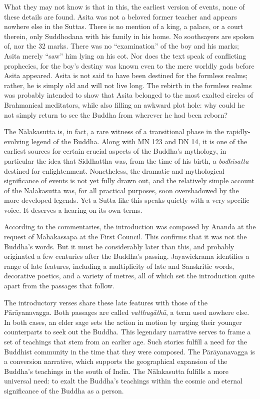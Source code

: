 \documentclass[12pt,openany]{book}%
\begin{document}
What they may not know is that in this, the earliest version of events, none of these details are found. Asita was not a beloved former teacher and appears nowhere else in the Suttas. There is no mention of a king, a palace, or a court therein, only Suddhodana with his family in his home. No soothsayers are spoken of, nor the 32 marks. There was no “examination” of the boy and his marks; Asita merely “saw” him lying on his cot. Nor does the text speak of conflicting prophecies, for the boy’s destiny was known even to the mere worldly gods before Asita appeared. Asita is not said to have been destined for the formless realms; rather, he is simply old and will not live long. The rebirth in the formless realms was probably intended to show that Asita belonged to the most exalted circles of Brahmanical meditators, while also filling an awkward plot hole: why could he not simply return to see the Buddha from wherever he had been reborn?

The \textsanskrit{Nālakasutta} is, in fact, a rare witness of a transitional phase in the rapidly-evolving legend of the Buddha. Along with MN 123 and DN 14, it is one of the earliest sources for certain crucial aspects of the Buddha’s mythology, in particular the idea that Siddhattha was, from the time of his birth, a \textit{bodhisatta} destined for enlightenment. Nonetheless, the dramatic and mythological significance of events is not yet fully drawn out, and the relatively simple account of the \textsanskrit{Nālakasutta} was, for all practical purposes, soon overshadowed by the more developed legends. Yet a Sutta like this speaks quietly with a very specific voice. It deserves a hearing on its own terms.

According to the commentaries, the introduction was composed by Ānanda at the request of \textsanskrit{Mahākassapa} at the First Council. This confirms that it was not the Buddha’s words. But it must be considerably later than this, and probably originated a few centuries after the Buddha’s passing. Jayawickrama identifies a range of late features, including a multiplicity of late and Sanskritic words, decorative poetics, and a variety of metres, all of which set the introduction quite apart from the passages that follow.

The introductory verses share these late features with those of the \textsanskrit{Pārāyanavagga}. Both passages are called \textit{\textsanskrit{vatthugāthā}}, a term used nowhere else. In both cases, an elder sage sets the action in motion by urging their younger counterparts to seek out the Buddha. This legendary narrative serves to frame a set of teachings that stem from an earlier age. Such stories fulfill a need for the Buddhist community in the time that they were composed. The \textsanskrit{Pārāyanavagga} is a conversion narrative, which supports the geographical expansion of the Buddha’s teachings in the south of India. The \textsanskrit{Nālakasutta} fulfills a more universal need: to exalt the Buddha’s teachings within the cosmic and eternal significance of the Buddha as a person.
\end{document}
